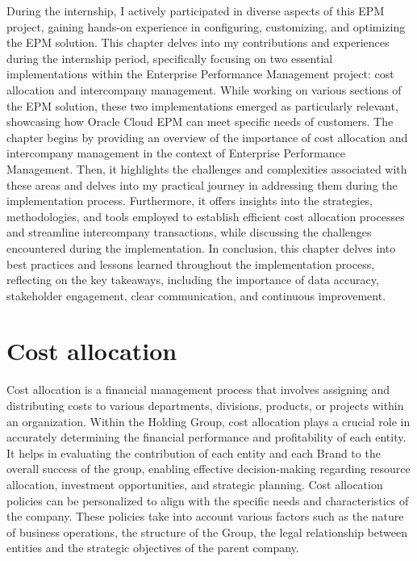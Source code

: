 \documentclass[12pt,a4paper,openright,twoside]{book}
\begin{document}
During the internship, I actively participated in diverse aspects of this EPM project, gaining hands-on experience in configuring, customizing, and optimizing the EPM solution. 
%
This chapter delves into my contributions and experiences during the internship period, specifically focusing on two essential implementations within the Enterprise Performance Management project: cost allocation and intercompany management. 
%
While working on various sections of the EPM solution, these two implementations emerged as particularly relevant, showcasing how Oracle Cloud EPM can meet specific needs of customers.
%
The chapter begins by providing an overview of the importance of cost allocation and intercompany management in the context of Enterprise Performance Management. 
%
Then, it highlights the challenges and complexities associated with these areas and delves into my practical journey in addressing them during the implementation process.
%
Furthermore, it offers insights into the strategies, methodologies, and tools employed to establish efficient cost allocation processes and streamline intercompany transactions, while discussing the challenges encountered during the implementation.
%
In conclusion, this chapter delves into best practices and lessons learned throughout the implementation process, reflecting on the key takeaways, including the importance of data accuracy, stakeholder engagement, clear communication, and continuous improvement. 

\section{Cost allocation}

Cost allocation is a financial management process that involves assigning and distributing costs to various departments, divisions, products, or projects within an organization. 
%
Within the Holding Group, cost allocation plays a crucial role in accurately determining the financial performance and profitability of each entity.
%
It helps in evaluating the contribution of each entity and each Brand to the overall success of the group, enabling effective decision-making regarding resource allocation, investment opportunities, and strategic planning.
%
Cost allocation policies can be personalized to align with the specific needs and characteristics of the company. 
%
These policies take into account various factors such as the nature of business operations, the structure of the Group, the legal relationship between entities and the strategic objectives of the parent company.
\end{document}
